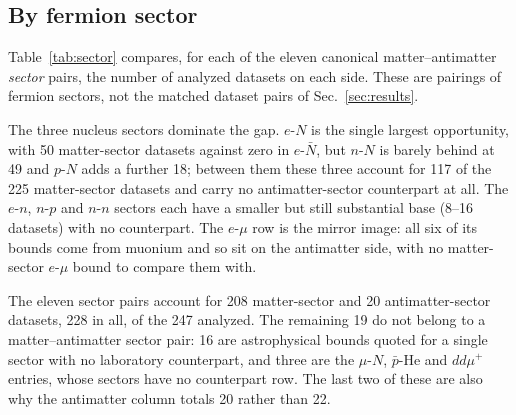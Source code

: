 \documentclass[
  aps,
  prd,
  reprint,
  amsmath,
  amssymb,
  nofootinbib,
  superscriptaddress,
  floatfix
]{revtex4-2}
\begin{document}
\subsection{By fermion sector}

Table~\ref{tab:sector} compares, for each of the eleven canonical
matter--antimatter \emph{sector} pairs, the number of analyzed datasets on
each side. These are pairings of fermion sectors, not the matched dataset
pairs of Sec.~\ref{sec:results}.

The three nucleus sectors dominate the gap. $e$-$N$ is the single largest
opportunity, with 50 matter-sector datasets against zero in $e$-$\bar N$,
but $n$-$N$ is barely behind at 49 and $p$-$N$ adds a further 18; between
them these three account for 117 of the 225 matter-sector datasets and
carry no antimatter-sector counterpart at all. The $e$-$n$, $n$-$p$ and
$n$-$n$ sectors each have a smaller but still substantial base (8--16
datasets) with no counterpart. The $e$-$\mu$ row is the mirror image: all
six of its bounds come from muonium and so sit on the antimatter side, with
no matter-sector $e$-$\mu$ bound to compare them with.

The eleven sector pairs account for 208 matter-sector and 20
antimatter-sector datasets, 228 in all, of the 247 analyzed. The remaining
19 do not belong to a matter--antimatter sector pair: 16 are
astrophysical bounds quoted for a single sector with no laboratory
counterpart, and three are the $\mu$-$N$, $\bar p$-He and $dd\mu^+$
entries, whose sectors have no counterpart row. The last two of these are
also why the antimatter column totals 20 rather than 22.
\end{document}
